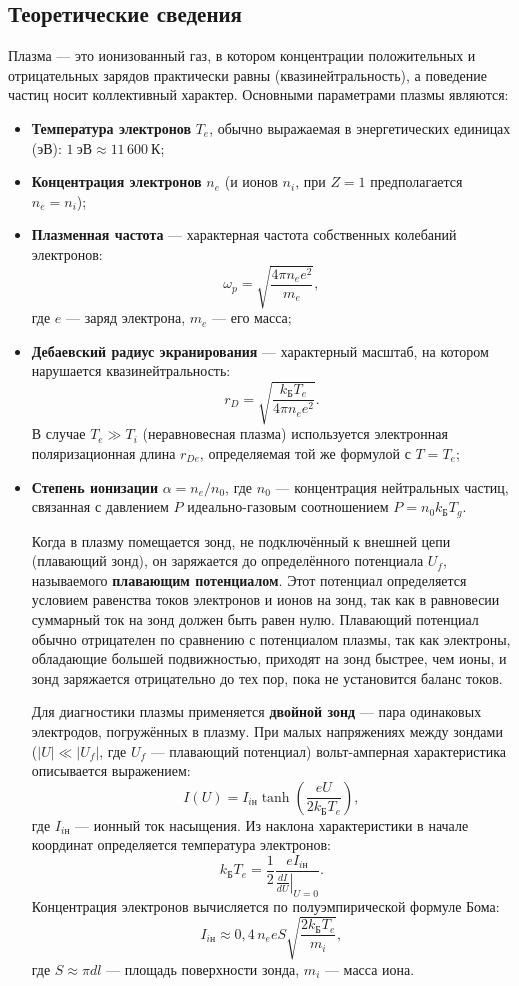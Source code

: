 \documentclass[a4paper]{article}
\begin{document}
\subsection{Теоретические сведения}
Плазма — это ионизованный газ, в котором концентрации положительных и отрицательных зарядов практически равны (квазинейтральность), а поведение частиц носит коллективный характер. Основными параметрами плазмы являются:
\begin{itemize}
\item \textbf{Температура электронов} $T_e$, обычно выражаемая в энергетических единицах (эВ): $1~\text{эВ} \approx 11\,600~\text{К}$;
    \item \textbf{Концентрация электронов} $n_e$ (и ионов $n_i$, при $Z=1$ предполагается $n_e = n_i$);
    \item \textbf{Плазменная частота} — характерная частота собственных колебаний электронов:
    \[
        \omega_p = \sqrt{\frac{4\pi n_e e^2}{m_e}},
    \]
    где $e$ — заряд электрона, $m_e$ — его масса;
    \item \textbf{Дебаевский радиус экранирования} — характерный масштаб, на котором нарушается квазинейтральность:
    \[
        r_D = \sqrt{\frac{k_\text{Б} T_e}{4\pi n_e e^2}}.
    \]
    В случае $T_e \gg T_i$ (неравновесная плазма) используется электронная поляризационная длина $r_{De}$, определяемая той же формулой с $T = T_e$;
    \item \textbf{Степень ионизации} $\alpha = n_e / n_0$, где $n_0$ — концентрация нейтральных частиц, связанная с давлением $P$ идеально-газовым соотношением $P = n_0 k_\text{Б} T_g$.

Когда в плазму помещается зонд, не подключённый к внешней цепи (плавающий зонд), он заряжается до определённого потенциала $U_f$, называемого \textbf{плавающим потенциалом}. Этот потенциал определяется условием равенства токов электронов и ионов на зонд, так как в равновесии суммарный ток на зонд должен быть равен нулю. Плавающий потенциал обычно отрицателен по сравнению с потенциалом плазмы, так как электроны, обладающие большей подвижностью, приходят на зонд быстрее, чем ионы, и зонд заряжается отрицательно до тех пор, пока не установится баланс токов.

Для диагностики плазмы применяется \textbf{двойной зонд} — пара одинаковых электродов, погружённых в плазму. При малых напряжениях между зондами ($|U| \ll |U_f|$, где $U_f$ — плавающий потенциал) вольт-амперная характеристика описывается выражением:
\[
    I(U) = I_{i\text{н}} \tanh\!\left(\frac{eU}{2k_\text{Б} T_e}\right),
\]
где $I_{i\text{н}}$ — ионный ток насыщения. Из наклона характеристики в начале координат определяется температура электронов:
\[
    k_\text{Б} T_e = \frac{1}{2} \frac{e I_{i\text{н}}}{\left.\frac{dI}{dU}\right|_{U=0}}.
\]
Концентрация электронов вычисляется по полуэмпирической формуле Бома:
\[
    I_{i\text{н}} \approx 0{,}4\, n_e e S \sqrt{\frac{2 k_\text{Б} T_e}{m_i}},
\]
где $S \approx \pi d l$ — площадь поверхности зонда, $m_i$ — масса иона.
\end{itemize}
\end{document}

